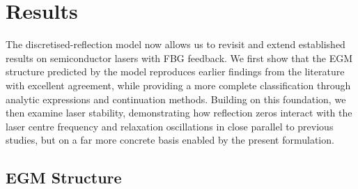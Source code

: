 \section{Results}
\label{sec:model_comparison}
%
The discretised-reflection model now allows us to revisit and extend established results on semiconductor lasers with FBG feedback.
We first show that the EGM structure predicted by the model reproduces earlier findings from the literature with excellent agreement, while providing a more complete classification through analytic expressions and continuation methods.
Building on this foundation, we then examine laser stability, demonstrating how reflection zeros interact with the laser centre frequency and relaxation oscillations in close parallel to previous studies, but on a far more concrete basis enabled by the present formulation.
%
%
\subsection{EGM Structure}
\label{subsec:EGM_structure}
%
